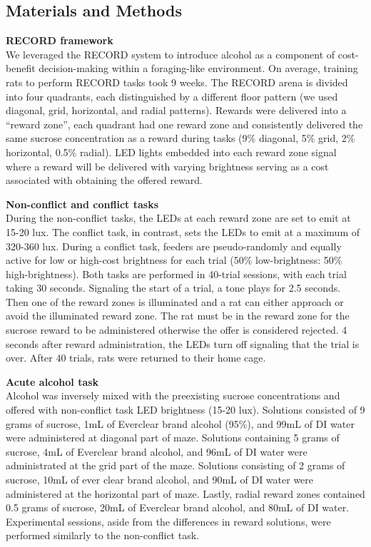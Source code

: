 \documentclass{article}
\begin{document}
\clearpage

\subsection{Materials and Methods}
\textbf{RECORD framework}\\
We leveraged the RECORD system to introduce alcohol as a component of cost-benefit decision-making within a foraging-like environment\cite{ibanez2024record}. On average, training rats to perform RECORD tasks took 9 weeks. The RECORD arena is divided into four quadrants, each distinguished by a different floor pattern (we used diagonal, grid, horizontal, and radial patterns). Rewards were delivered into a “reward zone”, each quadrant had one reward zone and consistently delivered the same sucrose concentration as a reward during tasks (9\% diagonal, 5\% grid, 2\% horizontal, 0.5\% radial). LED lights embedded into each reward zone signal where a reward will be delivered with varying brightness serving as a cost associated with obtaining the offered reward.

\vspace{1em}

\noindent\textbf{Non-conflict and conflict tasks}\\
During the non-conflict tasks, the LEDs at each reward zone are set to emit at 15-20 lux. The conflict task, in contrast, sets the LEDs to emit at a maximum of 320-360 lux. During a conflict task, feeders are pseudo-randomly and equally active for low or high-cost brightness for each trial (50\% low-brightness: 50\% high-brightness). Both tasks are performed in 40-trial sessions, with each trial taking 30 seconds. Signaling the start of a trial, a tone plays for 2.5 seconds. Then one of the reward zones is illuminated and a rat can either approach or avoid the illuminated reward zone. The rat must be in the reward zone for the sucrose reward to be administered otherwise the offer is considered rejected. 4 seconds after reward administration, the LEDs turn off signaling that the trial is over. After 40 trials, rats were returned to their home cage. 

\vspace{1em}

\noindent\textbf{Acute alcohol task}\\
Alcohol was inversely mixed with the preexisting sucrose concentrations and offered with non-conflict task LED brightness (15-20 lux). Solutions consisted of 9 grams of sucrose, 1mL of Everclear brand alcohol (95\%), and 99mL of DI water were administered at diagonal part of maze. Solutions containing 5 grams of sucrose, 4mL of Everclear brand alcohol, and 96mL of DI water were administrated at the grid part of the maze. Solutions consisting of 2 grams of sucrose, 10mL of ever clear brand alcohol, and 90mL of DI water were administered at the horizontal part of maze. Lastly, radial reward zones contained 0.5 grams of sucrose, 20mL of Everclear brand alcohol, and 80mL of DI water\cite{ibanez2024record}. Experimental sessions, aside from the differences in reward solutions, were performed similarly to the non-conflict task.
\end{document}
